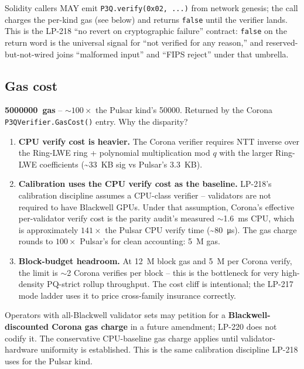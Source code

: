 Solidity callers MAY emit \texttt{P3Q.verify(0x02, ...)} from
network genesis; the call charges the per-kind gas (see below)
and returns \texttt{false} until the verifier lands. This is the
LP-218 ``no revert on cryptographic failure'' contract:
\texttt{false} on the return word is the universal signal for
``not verified for any reason,'' and reserved-but-not-wired
joins ``malformed input'' and ``FIPS reject'' under that
umbrella.

\subsection{Gas cost}

\textbf{\SI{5000000}{gas}} -- $\sim$$100\times$ the Pulsar
kind's \SI{50000}{}. Returned by the Corona
\texttt{P3QVerifier.GasCost()} entry. Why the disparity?

\begin{enumerate}[leftmargin=2em,nosep]
\item \textbf{CPU verify cost is heavier.} The Corona verifier
  requires NTT inverse over the Ring-LWE ring + polynomial
  multiplication mod $q$ with the larger Ring-LWE coefficients
  (\textasciitilde\SI{33}{KB} sig vs Pulsar's \SI{3.3}{KB}).
\item \textbf{Calibration uses the CPU verify cost as the
  baseline.} LP-218's calibration discipline assumes a
  CPU-class verifier -- validators are not required to have
  Blackwell GPUs. Under that assumption, Corona's effective
  per-validator verify cost is the parity audit's measured
  $\sim$\SI{1.6}{\milli\second} CPU, which is approximately
  $141\times$ the Pulsar CPU verify time
  (\textasciitilde\SI{80}{\micro\second}). The gas charge
  rounds to $100\times$ Pulsar's for clean accounting:
  \SI{5}{M} gas.
\item \textbf{Block-budget headroom.} At \SI{12}{M} block gas
  and \SI{5}{M} per Corona verify, the limit is $\sim$2 Corona
  verifies per block -- this is the bottleneck for very high-
  density PQ-strict rollup throughput. The cost cliff is
  intentional; the LP-217 mode ladder uses it to price
  cross-family insurance correctly.
\end{enumerate}

Operators with all-Blackwell validator sets may petition for a
\textbf{Blackwell-discounted Corona gas charge} in a future
amendment; LP-220 does not codify it. The conservative
CPU-baseline gas charge applies until validator-hardware
uniformity is established. This is the same calibration
discipline LP-218 uses for the Pulsar kind.

